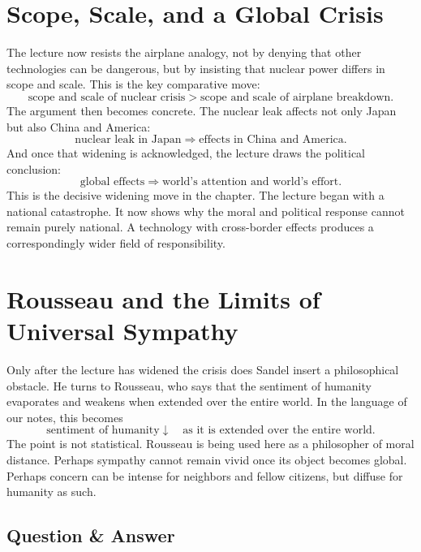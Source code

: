 \section{Scope, Scale, and a Global Crisis}

The lecture now resists the airplane analogy, not by denying that other technologies can be dangerous, but by insisting that nuclear power differs in scope and scale. This is the key comparative move:
\begin{equation}
\text{scope and scale of nuclear crisis}
>
\text{scope and scale of airplane breakdown}.
\end{equation}
The argument then becomes concrete. The nuclear leak affects not only Japan but also China and America:
\begin{equation}
\text{nuclear leak in Japan}
\Longrightarrow
\text{effects in China and America}.
\end{equation}
And once that widening is acknowledged, the lecture draws the political conclusion:
\begin{equation}
\text{global effects}
\Longrightarrow
\text{world's attention and world's effort}.
\end{equation}
This is the decisive widening move in the chapter. The lecture began with a national catastrophe. It now shows why the moral and political response cannot remain purely national. A technology with cross-border effects produces a correspondingly wider field of responsibility.

\section{Rousseau and the Limits of Universal Sympathy}

Only after the lecture has widened the crisis does Sandel insert a philosophical obstacle. He turns to Rousseau, who says that the sentiment of humanity evaporates and weakens when extended over the entire world. In the language of our notes, this becomes
\begin{equation}
\text{sentiment of humanity}
\downarrow
\quad \text{as it is extended over the entire world}.
\end{equation}
The point is not statistical. Rousseau is being used here as a philosopher of moral distance. Perhaps sympathy cannot remain vivid once its object becomes global. Perhaps concern can be intense for neighbors and fellow citizens, but diffuse for humanity as such.

\subsection{Question \& Answer}

